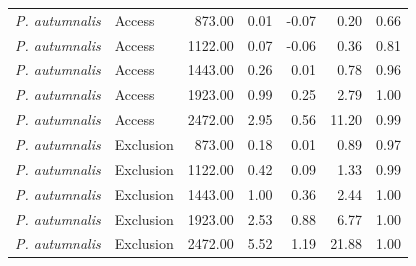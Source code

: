 \begin{tabular}{llrrrrr}
  \textit{P. autumnalis} & Access & 873.00 & 0.01 & -0.07 & 0.20 & 0.66 \\ 
  \textit{P. autumnalis} & Access & 1122.00 & 0.07 & -0.06 & 0.36 & 0.81 \\ 
  \textit{P. autumnalis} & Access & 1443.00 & 0.26 & 0.01 & 0.78 & 0.96 \\ 
  \textit{P. autumnalis} & Access & 1923.00 & 0.99 & 0.25 & 2.79 & 1.00 \\ 
  \textit{P. autumnalis} & Access & 2472.00 & 2.95 & 0.56 & 11.20 & 0.99 \\ 
  \textit{P. autumnalis} & Exclusion & 873.00 & 0.18 & 0.01 & 0.89 & 0.97 \\ 
  \textit{P. autumnalis} & Exclusion & 1122.00 & 0.42 & 0.09 & 1.33 & 0.99 \\ 
  \textit{P. autumnalis} & Exclusion & 1443.00 & 1.00 & 0.36 & 2.44 & 1.00 \\ 
  \textit{P. autumnalis} & Exclusion & 1923.00 & 2.53 & 0.88 & 6.77 & 1.00 \\ 
  \textit{P. autumnalis} & Exclusion & 2472.00 & 5.52 & 1.19 & 21.88 & 1.00 \\ 
   \hline
\end{tabular}